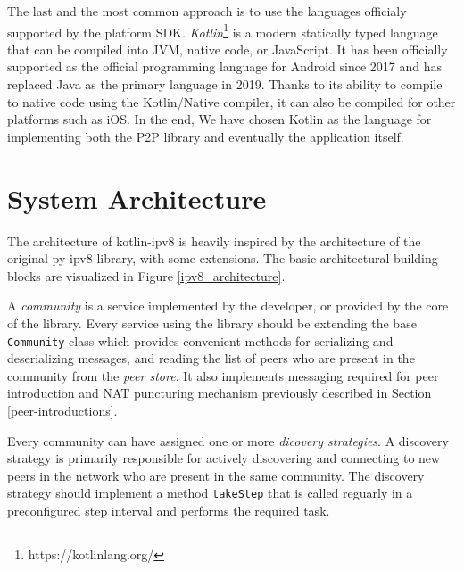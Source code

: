 The last and the most common approach is to use the languages officialy supported by the platform SDK. \textit{Kotlin}\footnote{https://kotlinlang.org/} is a modern statically typed language that can be compiled into JVM, native code, or JavaScript. It has been officially supported as the official programming language for Android since 2017 \cite{androidkotlin} and has replaced Java as the primary language in 2019. Thanks to its ability to compile to native code using the Kotlin/Native compiler, it can also be compiled for other platforms such as iOS. In the end, We have chosen Kotlin as the language for implementing both the P2P library and eventually the application itself.



\section{System Architecture}

The architecture of kotlin-ipv8 is heavily inspired by the architecture of the original py-ipv8 library, with some extensions. %
The basic architectural building blocks are visualized in Figure \ref{ipv8_architecture}.

A \textit{community} is a service implemented by the developer, or provided by the core of the library. Every service using the library should be extending the base \texttt{Community} class which provides convenient methods for serializing and deserializing messages, and reading the list of peers who are present in the community from the \textit{peer store}. It also implements messaging required for peer introduction and NAT puncturing mechanism previously described in Section \ref{peer-introductions}.

Every community can have assigned one or more \textit{dicovery strategies}. A discovery strategy is primarily responsible for actively discovering and connecting to new peers in the network who are present in the same community. The discovery strategy should implement a method \texttt{takeStep} that is called reguarly in a preconfigured step interval and performs the required task.



